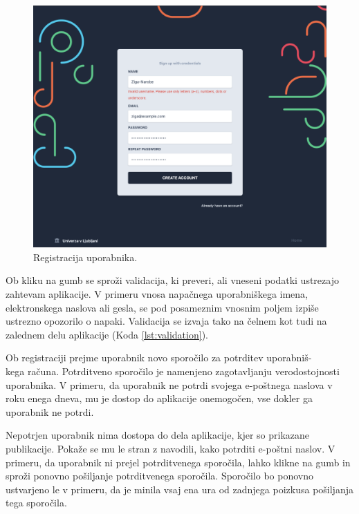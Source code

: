 \documentclass[a4paper, 12pt]{book}
\begin{document}
\begin{figure}[h]
\begin{center}
\includegraphics[width=1\textwidth]{slike/signup-validation.png}
\end{center}
\caption{ Registracija uporabnika. }
\label{signup-form}
\end{figure}

Ob kliku na gumb  se sproži validacija, ki preveri, ali vneseni podatki ustrezajo zahtevam aplikacije. V primeru vnosa napačnega uporabniškega imena, elektronskega naslova ali gesla, se pod posameznim vnosnim poljem izpiše ustrezno opozorilo o napaki. Validacija se izvaja tako na čelnem kot tudi na zalednem delu aplikacije (Koda \ref{lst:validation}).

Ob registraciji prejme uporabnik novo sporočilo za potrditev uporabniš-\\kega računa. Potrditveno sporočilo je namenjeno zagotavljanju verodostojnosti uporabnika. V primeru, da uporabnik ne potrdi svojega e-poštnega naslova v roku enega dneva, mu je dostop do aplikacije onemogočen, vse dokler ga uporabnik ne potrdi.

Nepotrjen uporabnik nima dostopa do dela aplikacije, kjer so prikazane publikacije. Pokaže se mu le stran z navodili, kako potrditi e-poštni naslov. V primeru, da uporabnik ni prejel potrditvenega sporočila, lahko klikne na gumb in sproži ponovno pošiljanje potrditvenega sporočila. Sporočilo bo ponovno ustvarjeno le v primeru, da je minila vsaj ena ura od zadnjega poizkusa pošiljanja tega sporočila.
\end{document}

